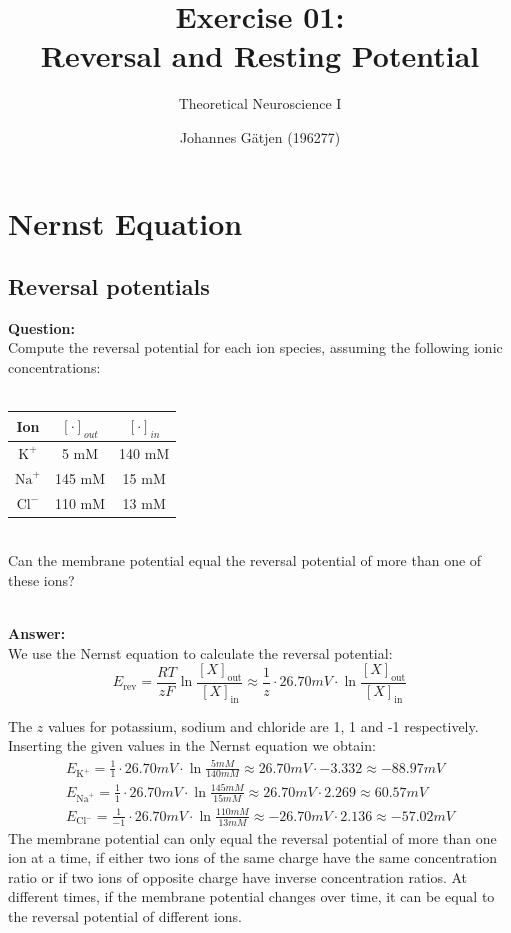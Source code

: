 \documentclass{scrartcl}
\title{Exercise 01:\\Reversal and Resting Potential}
\subtitle{Theoretical Neuroscience I}
\author{Johannes G\"atjen (196277)}
\newcommand\Answer{%
  \textbf{\\Answer:}%
}
\newcommand\Question{%
  \textbf{Question:}%
}
\begin{document}
\maketitle

\section{Nernst Equation}
\subsection{Reversal potentials}

\Question\\
Compute the reversal potential for each ion species, assuming the following ionic concentrations:\\
\\
\begin{tabular}{c | c c}
Ion & $[\cdot]_{out}$ & $[\cdot]_{in}$ \\ \hline
$\text{K}^+$ & 5 mM & 140 mM \\
$\text{Na}^+$ & 145 mM & 15 mM \\
$\text{Cl}^-$ & 110 mM & 13 mM
\end{tabular}\\
Can the membrane potential equal the reversal potential of more than one of these ions?

\Answer\\
We use the Nernst equation to calculate the reversal potential:
\begin{equation*}
E_{\text{rev}}=\frac{RT}{zF}\ln \frac{[X]_{\text{out}}}{[X]_{\text{in}}} \approx \frac{1}{z} \cdot 26.70 \si{mV} \cdot \ln \frac{[X]_{\text{out}}}{[X]_{\text{in}}}
\end{equation*}

The $z$ values for potassium, sodium and chloride are 1, 1 and -1 respectively. Inserting the given values in the Nernst equation we obtain:
\begin{equation*}
\begin{split}
E_{\text{K}^+}=\frac{1}{1} \cdot 26.70 \si{mV} \cdot \ln \frac{5 \si{mM}}{140 \si{mM}} \approx 26.70 \si{mV} \cdot -3.332 \approx -88.97 \si{mV}\\
E_{\text{Na}^+}=\frac{1}{1} \cdot 26.70 \si{mV} \cdot \ln \frac{145 \si{mM}}{15 \si{mM}} \approx 26.70 \si{mV} \cdot 2.269 \approx 60.57 \si{mV}\\
E_{\text{Cl}^-}=\frac{1}{-1} \cdot 26.70 \si{mV} \cdot \ln \frac{110 \si{mM}}{13 \si{mM}} \approx {-26.70} \si{mV} \cdot 2.136 \approx -57.02 \si{mV}
\end{split}
\end{equation*}
The membrane potential can only equal the reversal potential of more than one ion at a time, if either two ions of the same charge have the same concentration ratio or if two ions of opposite charge have inverse concentration ratios. At different times, if the membrane potential changes over time, it can be equal to the reversal potential of different ions.
\pagebreak
\end{document}
